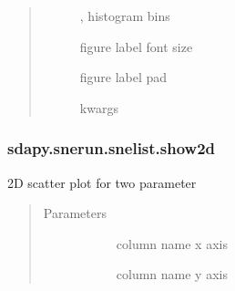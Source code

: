\documentclass[letterpaper,10pt,english]{sphinxmanual}
\begin{document}
\begin{fulllineitems}
\begin{fulllineitems}
\begin{quote}
\begin{description}
\begin{description}
\item[{}] \leavevmode{[}, \sphinxtitleref{list}{]}
histogram bins

\item[{}] \leavevmode{[}\sphinxtitleref{str}{]}
figure label font size

\item[{}] \leavevmode{[}\sphinxtitleref{str}{]}
figure label pad

\item[{}] \leavevmode{[}\sphinxtitleref{Keyword Arguments}{]}
 kwargs

\end{description}

\end{description}\end{quote}

\end{fulllineitems}



\subsubsection{sdapy.snerun.snelist.show2d}
\label{\detokenize{generated/sdapy.snerun.snelist.show2d:sdapy-snerun-snelist-show2d}}\label{\detokenize{generated/sdapy.snerun.snelist.show2d::doc}}

\begin{fulllineitems}
\label{\detokenize{generated/sdapy.snerun.snelist.show2d:sdapy.snerun.snelist.show2d}}
2D scatter plot for two parameter
\begin{quote}\begin{description}
\item[{Parameters}] \leavevmode\begin{description}
\item[{}] \leavevmode{[}\sphinxtitleref{str}{]}
column name x axis

\item[{}] \leavevmode{[}\sphinxtitleref{str}{]}
column name y axis


\end{description}
\end{description}
\end{quote}
\end{fulllineitems}
\end{fulllineitems}
\end{document}
